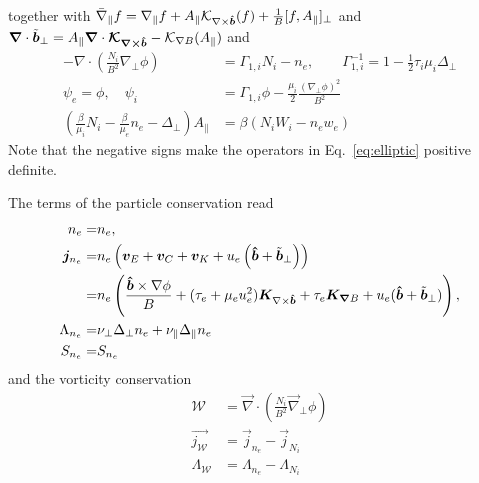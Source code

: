 together with
$\bar\nabla_\parallel f = \nabla_\parallel f + A_\parallel \mathcal K_{\nabla\times\bm{\hat{b}}}(f) + \frac{1}{B}[ f, A_\parallel]_\perp$
and ${\boldsymbol{\nabla}} \cdot \tilde{ {\boldsymbol{b}}}_\perp = A_\parallel {\boldsymbol{\nabla}}\cdot{\boldsymbol{ \mathcal{ K}_{\nabla\times\bm{\hat{b}}}}} - \mathcal K_{\nabla B}(A_\parallel) $
and
\begin{subequations} \label{eq:elliptic}
  \begin{align}
    -\nabla\cdot\left( \frac{N_i}{B^2}\nabla_\perp \phi \right) &= \Gamma_{1,i} N_i - n_e, \quad\quad
    \Gamma_{1,i}^{-1} = 1-\frac{1}{2}\tau_i\mu_i \Delta_\perp \\
    \psi_e = \phi, \quad \psi_i &= \Gamma_{1,i}\phi -\frac{\mu_i}{2}\frac{(\nabla_\perp\phi)^2}{B^2} \\
    \left(\frac{\beta}{\mu_i}N_i - \frac{\beta}{\mu_e}n_e-\Delta_\perp\right)
    A_\parallel &= \beta\left(N_iW_i-n_e w_e\right)
  \end{align}
\end{subequations}
Note that the negative signs make the operators in Eq.~\eqref{eq:elliptic} positive definite.

The terms of the particle conservation read
\begin{align} \label{eq:mass_conservation}
  n_e= & n_e,\\
  {\boldsymbol{j}}_{n_e} =& n_e\left(
  {\boldsymbol{v}}_E + {\boldsymbol{v}}_C + {\boldsymbol{v}}_{K} +u_e\left(\bm{\hat{b}}+\tilde{{\boldsymbol{b}}}_\perp\right)  \right) \nonumber\\
  =& n_e \left(\frac{\bm{\hat{b}}\times \nabla\phi}{B} 
  + (\tau_e +\mu_e u_e^2){\boldsymbol{K}}_{\nabla\times\bm{\hat{b}}} 
  + \tau_e {\boldsymbol{K}}_{{\boldsymbol{\nabla}} B} + u_e(\bm{\hat{b}} + \tilde{{\boldsymbol{b}}}_\perp) \right), \\
  \Lambda_{n_e} =&
  \nu_\perp\Delta_\perp n_e + \nu_\parallel\Delta_\parallel n_e
\\
  S_{n_e} =&  S_{n_e}
\end{align}
and the vorticity conservation
\begin{align} \label{eq:vorticity_conservation}
\mathcal W &= \vec{\nabla} \cdot\left(\frac{N_i}{B^2} \vec{\nabla}_\perp \phi\right) \nonumber\\
\vec{j_{\mathcal W}} &= \vec j_{n_e} - \vec j_{N_i} \nonumber\\
\Lambda_{\mathcal W} &= \Lambda_{n_e} - \Lambda_{N_i}
\end{align}

